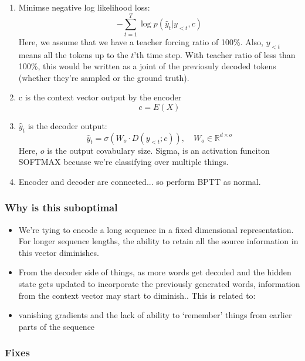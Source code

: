 \documentclass[11pt]{article}
\begin{document}
\begin{enumerate}
    \item Minimse negative log likelihood loss: \begin{equation}
        -\sum^T_{t=1}\log p(\hat y_t | y_{<t}, c)
    \end{equation}
    Here, we assume that we have a teacher forcing ratio of 100\%.
    Also, $y_{<t}$ means all the tokens up to the $t$'th time step. With teacher ratio of less than 100\%, this would be written as a joint of the previosuly decoded tokens (whether they're sampled or the ground truth).
    \item c is the context vector output by the encoder \begin{equation}
        c = E(X)
    \end{equation}
    \item $\hat y_t$ is the decoder output: \begin{equation}
        \hat y_t = \sigma(W_o \cdot D(y_{<t}; c)), \quad W_o \in \mathbb R^{d\times o}
    \end{equation}
    Here, $o$ is the output covabulary size. Sigma, is an activation funciton SOFTMAX becuase we're classifying over multiple things.
    \item Encoder and decoder are connected... so perform BPTT as normal.
\end{enumerate}

\subsubsection{Why is this suboptimal}

\begin{itemize}
    \item We're tying to encode a long sequence in a fixed dimensional representation. For longer sequence lengths, the ability to retain all the source information in this vector diminishes.
    \item From the decoder side of things, as more words get decoded and the hidden state gets updated to incorporate the previously generated words, information from the context vector may start to diminish.. This is related to:
    \item vanishing gradients and the lack of ability to `remember' things from earlier parts of the sequence
\end{itemize}

\subsubsection{Fixes}
\end{document}
